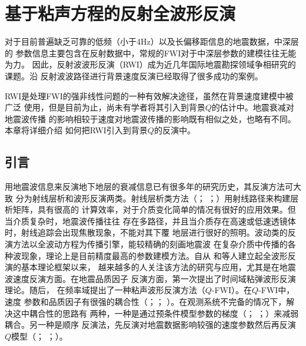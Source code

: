 
\chapter{基于粘声方程的反射全波形反演}

对于目前普遍缺乏可靠的低频（小于4Hz）以及长偏移距信息的地震数据，中深层的
参数信息主要包含在反射数据中，常规的FWI对于中深层参数的建模往往无能为力。
因此，反射波波形反演（RWI）成为近几年国际地震勘探领域争相研究的课题。沿
反射波波路径进行背景速度反演已经取得了很多成功的案例。

RWI是处理FWI的强非线性问题的一种有效解决途径，虽然在背景速度建模中被广泛
使用，但是目前为止，尚未有学者将其引入到背景$Q$的估计中。地震衰减对地震波传播
的影响相较于速度对地震波传播的影响既有相似之处，也略有不同。本章将详细介绍
如何把RWI引入到背景$Q$的反演中。

\vspace{1.0cm}
\section{引言}

用地震波信息来反演地下地层的衰减信息已有很多年的研究历史，其反演方法可大致
分为射线层析和波形反演两类。射线层析类方法（；
；）用射线路径来构建层析矩阵，具有很高的
计算效率，对于介质变化简单的情况有很好的应用效果。但当介质复杂时，地震波传播往往
存在多路径，并且当介质存在高速或低速透镜体时，射线追踪会出现焦散现象，不能对其下覆
地层进行很好的照明。波动类的反演方法以全波动方程为传播引擎，能较精确的刻画地震波
在复杂介质中传播的各种波现象，理论上是目前精度最高的参数建模方法。自从
和等人建立起全波形反演的基本理论框架以来，
越来越多的人关注该方法的研究与应用，尤其是在地震波速度反演方面。在地震品质因子
反演方面，第一次提出了时间域粘弹波形反演理论。随后，
在频率域提出了一种粘声波形反演方法（$Q$-FWI）。在$Q$-FWI中，速度
参数和品质因子有很强的耦合性（；；
）。在观测系统不完备的情况下，解决这中耦合性的思路有
两种，一种是通过预条件模型参数的梯度（；
；）来减弱耦合。另一种是顺序
反演法，先反演对地震数据影响较强的速度参数然后再反演$Q$模型（；
；）。

